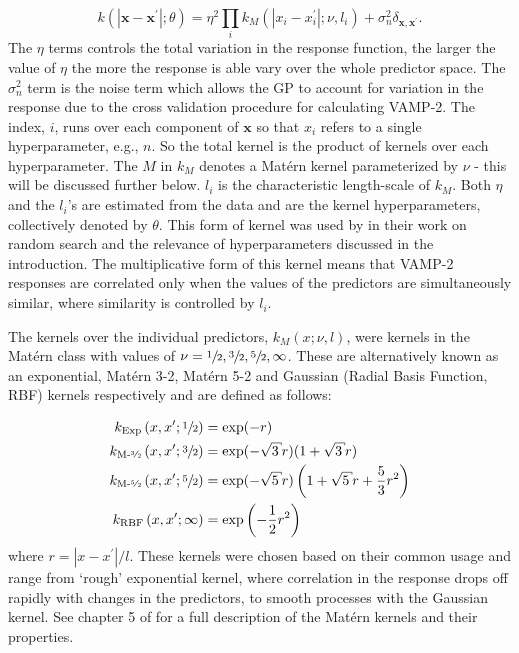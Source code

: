 \begin{equation}\label{eqn:kernel_form}
    k\left(\left|\mathbf{x}-\mathbf{x}^{\prime}\right|; \theta\right) = 
    \eta^{2}\prod_i k_{M}\left(\left|x_{i}-x_{i}^{\prime}\right|; \nu, l_i\right)
    +\sigma_{n}^{2}\delta_{\mathbf{x}, \mathbf{x}^{\prime}}. 
\end{equation}
The $\eta$ terms controls the total variation in the response function, the larger the value of $\eta$ the more the response is able vary over the whole predictor space. The $\sigma_{n}^{2}$ term is the noise term which allows the GP to account for variation in the response due to the cross validation procedure for calculating VAMP-2.  The index, $i$, runs over each component of $\mathbf{x}$ so that $x_{i}$ refers to a single hyperparameter, e.g., $n$. So the total kernel is the product of kernels over each hyperparameter.  The $M$ in $k_{M}$ denotes a Mat\'ern kernel parameterized by $\nu$ - this will be discussed further below. $l_{i}$ is the characteristic length-scale of $k_{M}$. Both $\eta$ and the $l_{i}$'s are estimated from the data and are the kernel hyperparameters, collectively denoted by $\theta$. This form of kernel was used by \cite{bergstrajamesbergstraRandomSearchHyperParameter2012} in their work on random search and the relevance of hyperparameters discussed in the introduction. The multiplicative form of this kernel means that VAMP-2 responses are correlated only when the values of the predictors are simultaneously similar, where similarity is controlled by $l_{i}$.    

The kernels over the individual predictors, $k_{M}(x; \nu, l)$, were kernels in the Mat\'{e}rn class with values of $\nu=\sfrac{1}{2},\sfrac{3}{2},\sfrac{5}{2},\infty$. These are alternatively known as an exponential, Mat\'{e}rn 3-2, Mat\'{e}rn 5-2 and  Gaussian (Radial Basis Function, RBF) kernels respectively and are defined as follows: 

\begin{align}
k_{\text{Exp}}\left(x, x^{\prime}; \sfrac{1}{2}\right) &=\exp (-r) \label{eqn:kern_exp}\\
k_{\text{M-\sfrac{3}{2}}}\left(x, x^{\prime}; \sfrac{3}{2}\right) &= \exp (-\sqrt{3} r)(1+\sqrt{3} r) \label{eqn:kern_m32} \\
k_{\text{M-\sfrac{5}{2}}}\left(x, x^{\prime}; \sfrac{5}{2}\right) &= \exp (-\sqrt{5} r)\left(1+\sqrt{5} r+\frac{5}{3} r^{2}\right) \label{eqn:kern_m52}\\
k_{\text{RBF}}\left(x, x^{\prime}; \infty\right) &= \exp \left(-\frac{1}{2} r^{2}\right) \label{eqn:kern_gauss}
\end{align}
where $r = |x-x^{\prime}|/l$. These kernels were chosen based on their common usage \cite{shahriariTakingHumanOut2016} and  range from `rough' exponential kernel, where correlation in the response drops off rapidly with changes in the predictors, to smooth processes with the Gaussian kernel. See chapter 5 of \cite{rasmussenGaussianProcessesMachine2006} for a full description of the Mat\'{e}rn kernels and their properties.  

